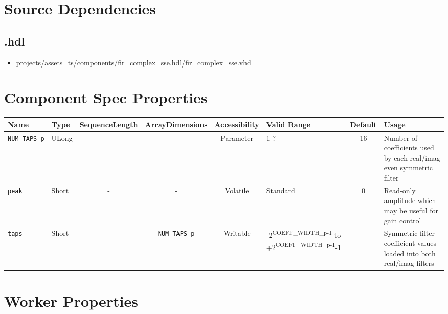 \section*{Source Dependencies}
\subsection*{\comp.hdl}
\begin{itemize}
	\item projects/assets\_ts/components/fir\_complex\_sse.hdl/fir\_complex\_sse.vhd
          
\end{itemize}

\begin{landscape}
	\section*{Component Spec Properties}
	\begin{scriptsize}
		\begin{tabular}{|p{1.5cm}|p{1cm}|c|c|c|p{3cm}|c|p{7cm}|}
			\hline
			\rowcolor{blue}
			Name               & Type   & SequenceLength & ArrayDimensions   & Accessibility	& Valid Range                                                                      & Default & Usage                                                                        \\
			\hline
			\verb+NUM_TAPS_p+  & ULong  & -              & -                 & Parameter		& 1-?                                                                              & 16      & Number of coefficients used by each real/imag even symmetric filter \\
			\hline
			\verb+peak+        & Short  & -              & -                 & Volatile		& Standard                                                                         & 0       & Read-only amplitude which may be useful for gain control                     \\
			\hline
			\verb+taps+        & Short  & -              & \verb+NUM_TAPS_p+ & Writable		& -2\textsuperscript{COEFF\_WIDTH\_p-1} to +2\textsuperscript{COEFF\_WIDTH\_p-1}-1 & -       & Symmetric filter coefficient values loaded into both real/imag filters       \\
			\hline
		\end{tabular}
	\end{scriptsize}

	\section*{Worker Properties}

\end{landscape}
